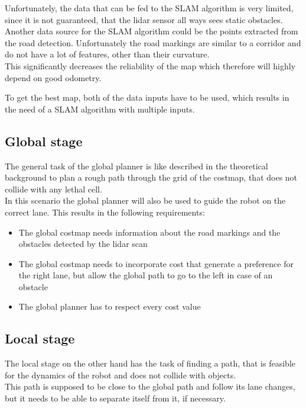 Unfortunately, the data that can be fed to the SLAM algorithm is very limited, since it is not guaranteed, that the lidar sensor all ways sees static obstacles. Another data source for the SLAM algorithm could be the points extracted from the road detection. Unfortunately the road markings are similar to a corridor and do not have a lot of features, other than their curvature.\\

This significantly decreases the reliability of the map which therefore will highly depend on good odometry.

To get the best map, both of the data inputs have to be used, which results in the need of a SLAM algorithm with multiple inputs.\\


\subsection{Global stage}
The general task of the global planner is like described in the theoretical background to plan a rough path through the grid of the costmap, that does not collide with any lethal cell.\\

In this scenario the global planner will also be used to guide the robot on the correct lane. This results in the following requirements:

\begin{itemize}
	\item The global costmap needs information about the road markings and the obstacles detected by the lidar scan
	\item The global costmap needs to incorporate cost that generate a preference for the right lane, but allow the global path to go to the left in case of an obstacle
	\item The global planner has to respect every cost value
\end{itemize}

\subsection{Local stage}
The local stage on the other hand has the task of finding a path, that is feasible for the dynamics of the robot and does not collide with objects.\\
This path is supposed to be close to the global path and follow its lane changes, but it needs to be able to separate itself from it, if necessary.

